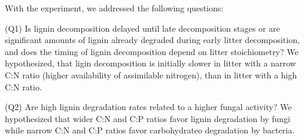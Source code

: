 With the experiment, we addressed the following questions:

(Q1) Is lignin decomposition delayed until late decomposition stages or are significant amounts of lignin already degraded during early litter decomposition, and does the timing of lignin decomposition depend on litter stoichiometry? We hypothesized, that ligin decomposition is initially slower in litter with a narrow C:N ratio (higher availability of assimilable nitrogen), than in litter with a high C:N ratio.

(Q2) Are high lignin degradation rates related to a higher fungal activity? We hypothesized that wider C:N and C:P ratios favor lignin degradation by fungi while narrow C:N and C:P ratios favor carbohydrateo degradation by bacteria. 